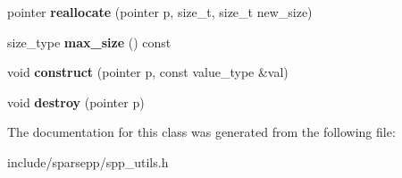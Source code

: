 \begin{DoxyCompactItemize}
\item 
pointer {\bfseries reallocate} (pointer p, size\+\_\+t, size\+\_\+t new\+\_\+size)\hypertarget{classspp___1_1libc__allocator_accdbc29d92193ccbf9dbebbe464e5b51}{}\label{classspp___1_1libc__allocator_accdbc29d92193ccbf9dbebbe464e5b51}

\item 
size\+\_\+type {\bfseries max\+\_\+size} () const \hypertarget{classspp___1_1libc__allocator_a75240dfe08e21b69576f6a7a8fb3bc57}{}\label{classspp___1_1libc__allocator_a75240dfe08e21b69576f6a7a8fb3bc57}

\item 
void {\bfseries construct} (pointer p, const value\+\_\+type \&val)\hypertarget{classspp___1_1libc__allocator_a9fb80454b2ac10640c6bfc02c35171d6}{}\label{classspp___1_1libc__allocator_a9fb80454b2ac10640c6bfc02c35171d6}

\item 
void {\bfseries destroy} (pointer p)\hypertarget{classspp___1_1libc__allocator_afc1282552730f3934c0a73d98358ab98}{}\label{classspp___1_1libc__allocator_afc1282552730f3934c0a73d98358ab98}

\end{DoxyCompactItemize}


The documentation for this class was generated from the following file\+:\begin{DoxyCompactItemize}
\item 
include/sparsepp/spp\+\_\+utils.\+h\end{DoxyCompactItemize}
